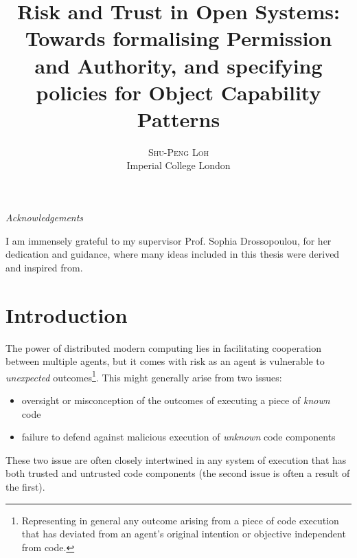 \documentclass[a4paper,11pt,twoside]{article}
\title{Risk and Trust in Open Systems:\\ \Large Towards formalising Permission and Authority, and specifying policies for Object Capability Patterns} %
\author{%
\textsc{Shu-Peng Loh} \\[1ex] %
\normalsize Imperial College London \\ %
}
\date{} %
\begin{document}
\let\sf\textsf

\raggedbottom
\thispagestyle{empty}
\tableofcontents
\thispagestyle{empty}
\clearpage
\thispagestyle{empty}
\begin{minipage}{\textwidth}
\begin{center}
\textit{Acknowledgements}
\end{center}
\small
I am immensely grateful to my supervisor Prof. Sophia Drossopoulou, for her dedication and guidance, where many ideas included in this thesis were derived and inspired from.\\
\end{minipage}
\maketitle
\setcounter{page}{1}
\pagestyle{fancy} %


\section{Introduction}
The power of distributed modern computing lies in facilitating cooperation between multiple agents, but it comes with risk as an agent is vulnerable to \textit{unexpected} outcomes\footnote{Representing in general any outcome arising from a piece of code execution that has deviated from an agent's original intention or objective independent from code.}. This might generally arise from two issues: 
\begin{itemize}
\item oversight or misconception of the outcomes of executing a piece of \textit{known} code
\item failure to defend against malicious execution of \textit{unknown} code components\end{itemize}
\noindent These two issue are often closely intertwined in any system of execution that has both trusted and untrusted code components (the second issue is often a result of the first).\\
\end{document}
